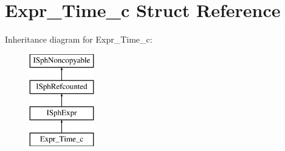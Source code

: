 \hypertarget{structExpr__Time__c}{\section{Expr\-\_\-\-Time\-\_\-c Struct Reference}
\label{structExpr__Time__c}
}
Inheritance diagram for Expr\-\_\-\-Time\-\_\-c\-:\begin{figure}[H]
\begin{center}
\leavevmode
\includegraphics[height=4.000000cm]{structExpr__Time__c}
\end{center}
\end{figure}
